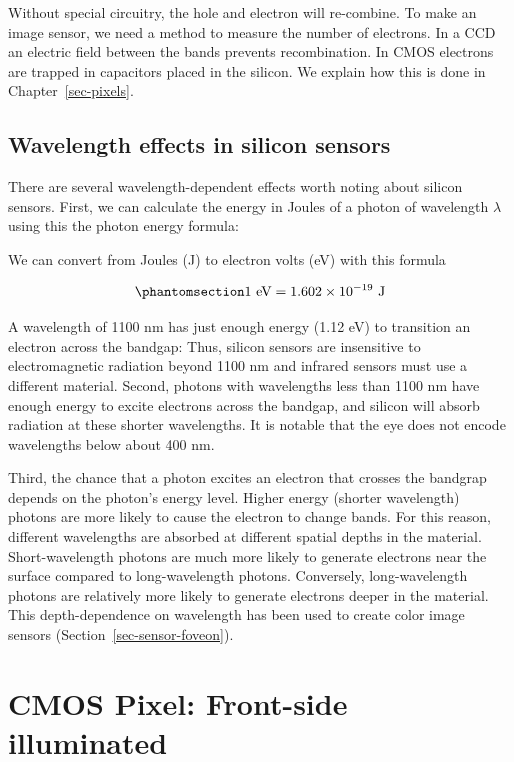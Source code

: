 \documentclass[
  letterpaper,
]{book}
\begin{document}
Without special circuitry, the hole and electron will re-combine. To
make an image sensor, we need a method to measure the number of
electrons. In a CCD an electric field between the bands prevents
recombination. In CMOS electrons are trapped in capacitors placed in the
silicon. We explain how this is done in Chapter~\ref{sec-pixels}.

\subsection{Wavelength effects in silicon
sensors}\label{sec-wavelength-effects}

There are several wavelength-dependent effects worth noting about
silicon sensors. First, we can calculate the energy in Joules of a
photon of wavelength \(\lambda\) using this the photon energy formula:

We can convert from Joules (J) to electron volts (eV) with this formula

\begin{equation}\phantomsection\label{eq-joules-ev}{
1~\text{eV} = {1.602 \times 10^{-19}}~\text{J} 
}\end{equation}

A wavelength of 1100 nm has just enough energy (1.12 eV) to transition
an electron across the bandgap: Thus, silicon sensors are insensitive to
electromagnetic radiation beyond 1100 nm and infrared sensors must use a
different material. Second, photons with wavelengths less than 1100 nm
have enough energy to excite electrons across the bandgap, and silicon
will absorb radiation at these shorter wavelengths. It is notable that
the eye does not encode wavelengths below about 400 nm.

Third, the chance that a photon excites an electron that crosses the
bandgrap depends on the photon's energy level. Higher energy (shorter
wavelength) photons are more likely to cause the electron to change
bands. For this reason, different wavelengths are absorbed at different
spatial depths in the material. Short-wavelength photons are much more
likely to generate electrons near the surface compared to
long-wavelength photons. Conversely, long-wavelength photons are
relatively more likely to generate electrons deeper in the material.
This depth-dependence on wavelength has been used to create color image
sensors (Section~\ref{sec-sensor-foveon}).

\section{CMOS Pixel: Front-side illuminated}\label{sec-cmos-pixel-fsi}
\end{document}
